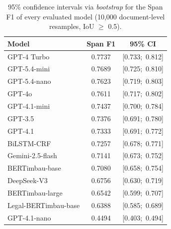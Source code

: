 \begin{table}[ht]
    \centering
    \caption{95\% confidence intervals via \textit{bootstrap} for the Span F1 of every evaluated model (10,000 document-level resamples, IoU $\geq$ 0.5).}
    \label{tab:bootstrap_ic}
    \small
    \begin{tabular}{lcc}
        \hline
        \textbf{Model} & \textbf{Span F1} & \textbf{95\% CI} \\
        \hline
        GPT-4 Turbo                         & 0.7737 & [0.733;\ 0.812] \\
        GPT-5.4-mini                        & 0.7689 & [0.725;\ 0.810] \\
        GPT-5.4-nano                        & 0.7623 & [0.719;\ 0.803] \\
        GPT-4o                              & 0.7611 & [0.717;\ 0.802] \\
        GPT-4.1-mini                        & 0.7437 & [0.700;\ 0.784] \\
        GPT-3.5                             & 0.7376 & [0.691;\ 0.780] \\
        GPT-4.1                             & 0.7333 & [0.691;\ 0.772] \\
        BiLSTM-CRF                          & 0.7257 & [0.678;\ 0.771] \\
        Gemini-2.5-flash                    & 0.7141 & [0.673;\ 0.752] \\
        BERTimbau-base                      & 0.7080 & [0.658;\ 0.754] \\
        DeepSeek-V3                         & 0.6756 & [0.630;\ 0.719] \\
        BERTimbau-large                     & 0.6542 & [0.599;\ 0.707] \\
        Legal-BERTimbau-base                & 0.6388 & [0.585;\ 0.689] \\
        GPT-4.1-nano                        & 0.4494 & [0.403;\ 0.494] \\
        \hline
    \end{tabular}
\end{table}
